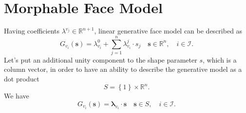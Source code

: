 \section{Morphable Face Model}

Having coefficients $\lambda^{v_j} \in \mathbb{R}^{n + 1}$,
linear generative face model can be described as
\begin{equation*}
  G_{v_i}\left( \pmb{s} \right)
  = \lambda^0_{v_i} + \sum_{j = 1}^{n} \lambda^j_{v_i} \cdot s_j
  \quad \pmb{s} \in \mathbb{R}^n,
  \quad i \in \mathcal{I}.
\end{equation*}
Let's put an additional unity component to the shape parameter $s$,
which is a column vector,
in order to have an ability to describe
the generative model as a dot product
\begin{equation*}
  S = \left\{ 1 \right\} \times \mathbb{R}^n.
\end{equation*}
We have
\begin{equation*}
  G_{v_i}\left( \pmb{s} \right)
  = \pmb{\lambda}_{v_i} \cdot \pmb{s}
  \quad \pmb{s} \in S,
  \quad i \in \mathcal{I}.
\end{equation*}
